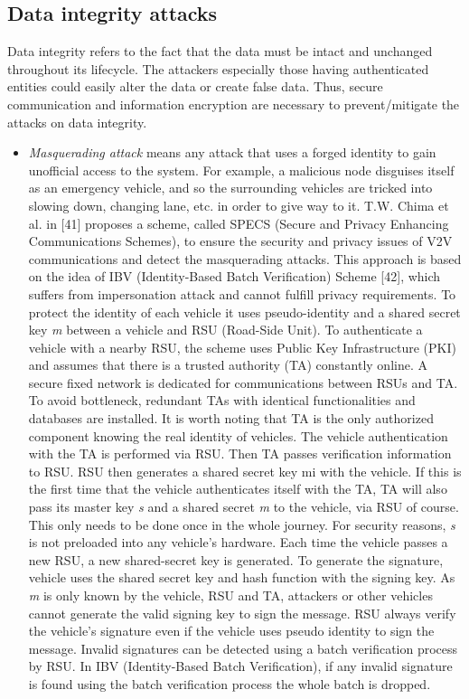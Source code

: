     \subsection{Data integrity attacks}
    Data integrity refers to the fact that the data must be intact and unchanged throughout its lifecycle. The attackers especially those having authenticated entities could easily alter the data or create false data. Thus, secure communication and information encryption are necessary to prevent/mitigate the attacks on data integrity.
    \begin{itemize}
        \item \textit{Masquerading attack} means any attack that uses a forged identity to gain unofficial access to the system. For example, a malicious node disguises itself as an emergency vehicle, and so the surrounding vehicles are tricked into slowing down, changing lane, etc. in order to give way to it.
        \newline 
        T.W. Chima et al. in [41]  proposes a scheme, called SPECS (Secure and Privacy Enhancing Communications Schemes), to ensure the security and privacy issues of V2V communications and detect the masquerading attacks. This approach is based on the idea of IBV (Identity-Based Batch Verification) Scheme [42], which suffers from impersonation attack and cannot fulfill privacy requirements. To protect the identity of each vehicle it uses pseudo-identity and a shared secret key \textit{m} between a vehicle and RSU (Road-Side Unit).
        \newline
        To authenticate a vehicle with a nearby RSU, the scheme uses Public Key Infrastructure (PKI) and assumes that there is a trusted authority (TA) constantly online. A secure fixed network is dedicated for communications between RSUs and TA. To avoid bottleneck, redundant TAs with identical functionalities and databases are installed. It is worth noting that TA is the only authorized component knowing the real identity of vehicles. The vehicle authentication with the TA is performed via RSU. Then TA passes verification information to RSU. RSU then generates a shared secret key mi with the vehicle. If this is the first time that the vehicle authenticates itself with the TA, TA will also pass its master key \textit{s} and a shared secret \textit{m} to the vehicle, via RSU of course. This only needs to be done once in the whole journey. For security reasons, \textit{s} is not preloaded into any vehicle’s hardware. Each time the vehicle passes a new RSU, a new shared-secret key is generated. To generate the signature, vehicle uses the shared secret key and hash function with the signing key. As \textit{m} is only known by the vehicle, RSU and TA, attackers or other vehicles cannot generate the valid signing key to sign the message. RSU always verify the vehicle’s signature even if the vehicle uses pseudo identity to sign the message. Invalid signatures can be detected using a batch verification process by RSU. In IBV (Identity-Based Batch Verification), if any invalid signature is found using the batch verification process the whole batch is dropped.

\end{itemize}
